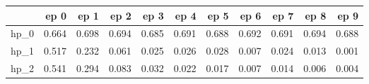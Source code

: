 \begin{tabular}{lrrrrrrrrrr}
\toprule
{} &   ep 0 &   ep 1 &   ep 2 &   ep 3 &   ep 4 &   ep 5 &   ep 6 &   ep 7 &   ep 8 &   ep 9 \\
\midrule
hp\_0 &  0.664 &  0.698 &  0.694 &  0.685 &  0.691 &  0.688 &  0.692 &  0.691 &  0.694 &  0.688 \\
hp\_1 &  0.517 &  0.232 &  0.061 &  0.025 &  0.026 &  0.028 &  0.007 &  0.024 &  0.013 &  0.001 \\
hp\_2 &  0.541 &  0.294 &  0.083 &  0.032 &  0.022 &  0.017 &  0.007 &  0.014 &  0.006 &  0.004 \\
\bottomrule
\end{tabular}
